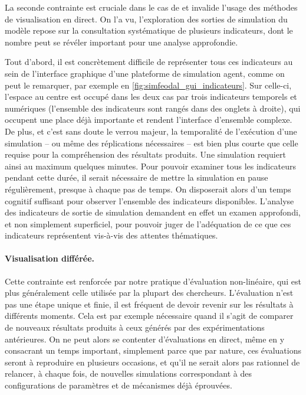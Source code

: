La seconde contrainte est cruciale dans le cas de \simfeodal{} et invalide l'usage des méthodes de visualisation en direct.
On l'a vu, l'exploration des sorties de simulation du modèle repose sur la consultation systématique de plusieurs indicateurs, dont le nombre peut se révéler important pour une analyse approfondie.

Tout d'abord, il est concrètement difficile de représenter tous ces indicateurs au sein de l'interface graphique d'une plateforme de simulation agent, comme on peut le remarquer, par exemple en \cref{fig:simfeodal_gui_indicateurs}.
Sur celle-ci, l'espace au centre est occupé dans les deux cas par trois indicateurs temporels et numériques (l'ensemble des indicateurs sont rangés dans des onglets à droite), qui occupent une place déjà importante et rendent l'interface d'ensemble complexe.
De plus, et c'est sans doute le verrou majeur, la temporalité de l'exécution d'une simulation -- ou même des réplications nécessaires -- est bien plus courte que celle requise pour la compréhension des résultats produits.
Une simulation requiert ainsi au maximum quelques minutes.
Pour pouvoir examiner tous les indicateurs pendant cette durée, il serait nécessaire de mettre la simulation en pause régulièrement, presque à chaque pas de temps.
On disposerait alors d'un temps cognitif suffisant pour observer l'ensemble des indicateurs disponibles.
L'analyse des indicateurs de sortie de simulation demandent en effet un examen approfondi, et non simplement superficiel, pour pouvoir juger de l'adéquation de ce que ces indicateurs représentent vis-à-vis des attentes thématiques.

\paragraph{Visualisation différée.}

Cette contrainte est renforcée par notre pratique d'évaluation non-linéaire, qui est plus généralement celle utilisée par la plupart des chercheurs.
L'évaluation n'est pas une étape unique et finie, il est fréquent de devoir revenir sur les résultats à différents moments.
Cela est par exemple nécessaire quand il s'agit de comparer de nouveaux résultats produits à ceux générés par des expérimentations antérieures.
On ne peut alors se contenter d'évaluations en direct, même en y consacrant un temps important, simplement parce que par nature, ces évaluations seront à reproduire en plusieurs occasions, et qu'il ne serait alors pas rationnel de relancer, à chaque fois, de nouvelles simulations correspondant à des configurations de paramètres et de mécanismes déjà éprouvées.

